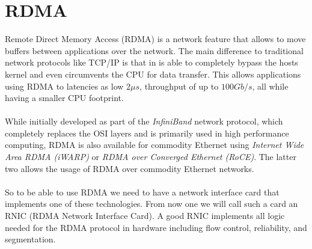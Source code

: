 \section{RDMA}

Remote Direct Memory Access (RDMA) is a network feature that allows to move buffers between applications over the network.
The main difference to traditional network protocols like TCP/IP is that in is able to completely bypass the hosts kernel
and even circumvents the CPU for data transfer. This allows applications using RDMA to latencies as low $2 \mu s$, 
throughput of up to $100 Gb/s$, all while having a smaller CPU footprint.


\paragraph{} While initially developed as part of the \emph{InfiniBand} network protocol, which completely replaces the OSI 
layers and is primarily used in high performance computing, RDMA is also available for commodity Ethernet using 
\emph{Internet Wide Area RDMA (iWARP)} or \emph{RDMA over Converged Ethernet (RoCE)}. The latter two allows the usage of 
RDMA over commodity Ethernet networks. 


\paragraph{} So to be able to use RDMA we need to have a network interface card that implements one of these technologies. 
From now one we will call such a card an RNIC (RDMA Network Interface Card). A good RNIC implements all logic needed for 
the RDMA protocol in hardware including flow control, reliability, and segmentation.



